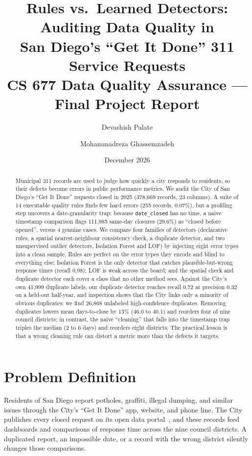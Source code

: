 \documentclass[11pt]{article}
\title{\textbf{Rules vs.\ Learned Detectors: Auditing Data Quality in\\
San Diego's ``Get It Done'' 311 Service Requests}\\[4pt]
\large CS 677 Data Quality Assurance --- Final Project Report}
\author{Devashish Palate \and Mohammadreza Ghassemzadeh}
\date{December 2026}
\begin{document}
\maketitle

\begin{abstract}
\noindent
Municipal 311 records are used to judge how quickly a city responds to residents, so their defects become errors in public performance metrics. We audit the City of San Diego's ``Get It Done'' requests closed in 2025 (378,669 records, 23 columns). A suite of 14 executable quality rules finds few hard errors (255 records, 0.07\%), but a profiling step uncovers a date-granularity trap: because \texttt{date\_closed} has no time, a naive timestamp comparison flags 111,985 same-day closures (29.6\%) as ``closed before opened'', versus 4 genuine cases. We compare four families of detectors (declarative rules, a spatial nearest-neighbour consistency check, a duplicate detector, and two unsupervised outlier detectors, Isolation Forest and LOF) by injecting eight error types into a clean sample. Rules are perfect on the error types they encode and blind to everything else; Isolation Forest is the only detector that catches plausible-but-wrong response times (recall 0.98); LOF is weak across the board; and the spatial check and duplicate detector each cover a class that no other method sees. Against the City's own 41,999 duplicate labels, our duplicate detector reaches recall 0.72 at precision 0.32 on a held-out half-year, and inspection shows that the City links only a minority of obvious duplicates: we find 26,868 unlabeled high-confidence duplicates. Removing duplicates lowers mean days-to-close by 13\% (46.0 to 40.1) and reorders four of nine council districts; in contrast, the naive ``cleaning'' that falls into the timestamp trap triples the median (2 to 6 days) and reorders eight districts. The practical lesson is that a wrong cleaning rule can distort a metric more than the defects it targets.
\end{abstract}

\section{Problem Definition}

Residents of San Diego report potholes, graffiti, illegal dumping, and similar issues through the City's ``Get It Done'' app, website, and phone line. The City publishes every closed request on its open data portal~\cite{sdopendata}, and these records feed dashboards and comparisons of response time across the nine council districts. A duplicated report, an impossible date, or a record with the wrong district silently changes those comparisons.
\end{document}
